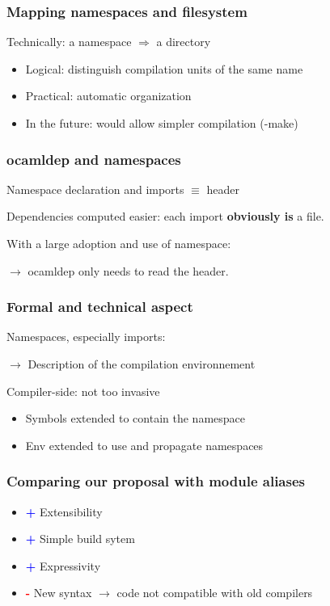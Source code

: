 \documentclass{beamer}
\begin{document}
\begin{frame}
\frametitle{Mapping namespaces and filesystem}

Technically: a namespace $\Rightarrow$ a directory

\medskip

\pause

\begin{itemize}[<+->]
\item Logical: distinguish compilation units of the same name
\item Practical: automatic organization
\item In the future: would allow simpler compilation (-make)
\end{itemize}

\end{frame}

\begin{frame}
\frametitle{ocamldep and namespaces}

Namespace declaration and imports $\equiv$ header

\bigskip

Dependencies computed easier: each import \textbf{obviously is} a file.

\bigskip

With a large adoption and use of namespace: 

$\rightarrow$ ocamldep only needs to read the header.

\end{frame}

\begin{frame}
\frametitle{Formal and technical aspect}

Namespaces, especially imports:

 $\rightarrow$ Description of the compilation environnement

\bigskip

Compiler-side: not too invasive
\begin{itemize}[<+->]
\item Symbols extended to contain the namespace
\item Env extended to use and propagate namespaces
\end{itemize}

\end{frame}

\begin{frame}
\frametitle{Comparing our proposal with module aliases}
\begin{itemize}[<+->]
\item \textcolor{blue}{\textbf{+}} Extensibility
\item \textcolor{blue}{\textbf{+}} Simple build sytem
\item \textcolor{blue}{\textbf{+}} Expressivity
\item \textcolor{red}{\textbf{-}} New syntax $\rightarrow$ code not compatible with old compilers
\end{itemize}
\end{frame}
\end{document}
